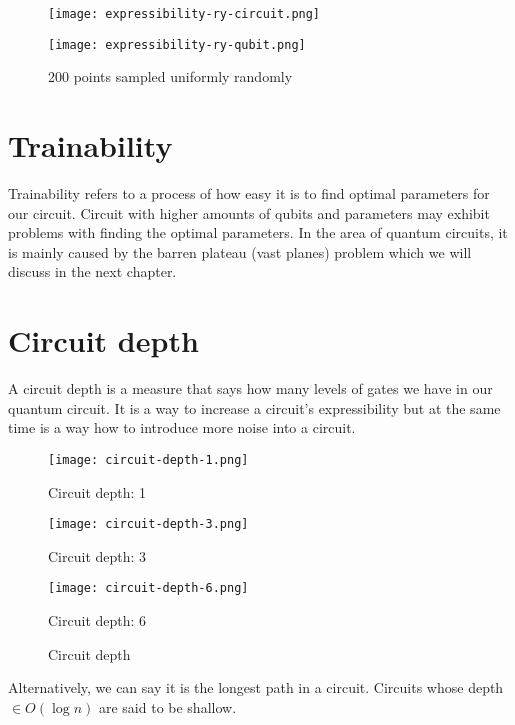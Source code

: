 \begin{figure}[H]
    \centering
    \begin{minipage}{0.4\linewidth}
        \centering
        \texttt{[image: expressibility-ry-circuit.png]}
        \vfill
    \end{minipage}
    \hfill
    \begin{minipage}{0.4\linewidth}
        \centering
        \texttt{[image: expressibility-ry-qubit.png]}
        \vfill
    \end{minipage}
    \caption{200 points sampled uniformly randomly}
\end{figure}


\section{Trainability}
Trainability refers to a process of how easy it is to find optimal parameters for our circuit. Circuit with higher amounts of qubits and parameters may exhibit problems with finding the optimal parameters. In the area of quantum circuits, it is mainly caused by the barren plateau (vast planes) problem which we will discuss in the next chapter.

\section{Circuit depth}
A circuit depth is a measure that says how many levels of gates we have in our quantum circuit. It is a way to increase a circuit's expressibility but at the same time is a way how to introduce more noise into a circuit. 

\begin{figure}[H]
    \centering
    \begin{minipage}{0.2\linewidth}
        \centering
        \texttt{[image: circuit-depth-1.png]}
        \caption*{Circuit depth: 1}\label{fig:circuit_depth_1}
    \end{minipage}
    \hfill
    \begin{minipage}{0.3\linewidth}
        \centering
        \texttt{[image: circuit-depth-3.png]}
        \caption*{Circuit depth: 3}\label{fig:circuit_depth_3}
    \end{minipage}
    \hfill
    \begin{minipage}{0.45\linewidth}
        \centering
        \texttt{[image: circuit-depth-6.png]}
        \caption*{Circuit depth: 6}\label{fig:circuit_depth_6}
    \end{minipage}
    \caption{Circuit depth}
\end{figure}
Alternatively, we can say it is the longest path in a circuit. Circuits whose depth $\in O(\log n)$ are said to be shallow.

